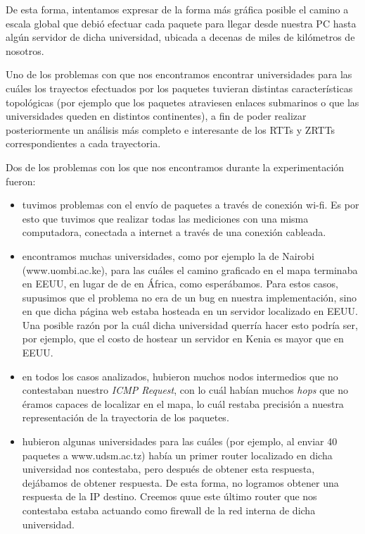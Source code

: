 \documentclass[final,inline,a4paper,narroweqnarray]{ieee}
\begin{document}
De esta forma, intentamos expresar de la forma más gráfica posible el camino a
escala global que debió efectuar cada paquete para llegar desde nuestra PC hasta
algún servidor de dicha universidad, ubicada a decenas de miles de kilómetros de
nosotros.

Uno de los problemas con que nos encontramos encontrar universidades para las
cuáles los trayectos efectuados por los paquetes tuvieran distintas
características topológicas (por ejemplo que los paquetes atraviesen enlaces
submarinos o que las universidades queden en distintos continentes), a fin de
poder realizar posteriormente un análisis más completo e interesante de los RTTs
y ZRTTs correspondientes a cada trayectoria.

Dos de los problemas con los que nos encontramos durante la experimentación fueron:
\begin{itemize}
	
  \item tuvimos problemas con el envío de paquetes a través de conexión wi-fi.
  Es por esto que tuvimos que realizar todas las mediciones con una misma
  computadora, conectada a internet a través de una conexión cableada.
	
  \item encontramos muchas universidades, como por ejemplo la de Nairobi
  (www.uombi.ac.ke), para las cuáles el camino graficado en el mapa terminaba en
  EEUU, en lugar de de en África, como esperábamos. Para estos casos, supusimos
  que el problema no era de un bug en nuestra implementación, sino en que dicha
  página web estaba hosteada en un servidor localizado en EEUU. Una posible
  razón por la cuál dicha universidad querría hacer esto podría ser, por
  ejemplo, que el costo de hostear un servidor en Kenia es mayor que en EEUU.
	
  \item en todos los casos analizados, hubieron muchos nodos intermedios que no
  contestaban nuestro \emph{ICMP Request}, con lo cuál habían muchos \emph{hops}
  que no éramos capaces de localizar en el mapa, lo cuál restaba precisión a
  nuestra representación de la trayectoria de los paquetes.
	
  \item hubieron algunas universidades para las cuáles (por ejemplo, al enviar
  40 paquetes a www.udsm.ac.tz) había un primer router localizado en dicha
  universidad nos contestaba, pero después de obtener esta respuesta, dejábamos
  de obtener respuesta. De esta forma, no logramos obtener una respuesta de la
  IP destino. Creemos quue este último router que nos contestaba estaba actuando
  como firewall de la red interna de dicha universidad.
  \end{itemize}
\end{document}
